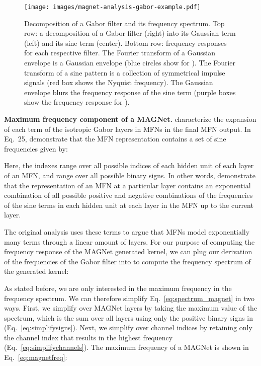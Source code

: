 \documentclass{article} \usepackage{iclr2022_conference,times}
\begin{document}
\begin{figure}[t]
    \vspace{-2.5mm}
    \centering
    \texttt{[image: images/magnet-analysis-gabor-example.pdf]}
    \caption{Decomposition of  a Gabor filter and its frequency spectrum. Top row: a decomposition of a Gabor filter (right) into its Gaussian term (left) and its sine term (center). Bottom row: frequency responses for each respective filter. The Fourier transform of a Gaussian envelope is a Gaussian envelope (blue circles show  for ). The Fourier transform of a sine pattern is a collection of symmetrical impulse signals (red box shows the Nyquist frequency). The Gaussian envelope blurs the frequency response of the sine term (purple boxes show the frequency response for ).
    \vspace{-2mm}}
    \label{fig:gabor-example}
\end{figure}

\textbf{Maximum frequency component of a MAGNet.} \citet{fathony2021multiplicative} characterize the expansion of each term of the isotropic Gabor layers in MFNs in the final MFN output. In Eq.~25, \citet{fathony2021multiplicative} demonstrate that the MFN representation contains a set of sine frequencies  given by:

Here, the indexes  range over all possible indices of each hidden unit of each layer of an MFN, and  range over all  possible binary signs. In other words, \citet{fathony2021multiplicative} demonstrate that the representation of an MFN at a particular layer contains an exponential combination of all possible positive and negative combinations of the frequencies of the sine terms in each hidden unit at each layer in the MFN up to the current layer.

The original analysis uses these terms to argue that MFNs model exponentially many terms through a linear amount of layers. For our purpose of computing the frequency response of the MAGNet generated kernel, we can plug our derivation of the frequencies of the Gabor filter  into  to compute the frequency spectrum of the generated kernel:

As stated before, we are only interested in the maximum frequency in the frequency spectrum. We can therefore simplify Eq.~\ref{eq:spectrum_magnet} in two ways. First, we simplify over MAGNet layers by taking the maximum value of the spectrum, which is the sum over all layers using only the positive binary signs in  (Eq.~\ref{eq:simplifysigns}). Next, we simplify over channel indices by retaining only the channel index that results in the highest frequency (Eq.~\ref{eq:simplifychannels}). The maximum frequency of a MAGNet is shown in Eq.~\ref{eq:magnetfreq}: 
\end{document}
